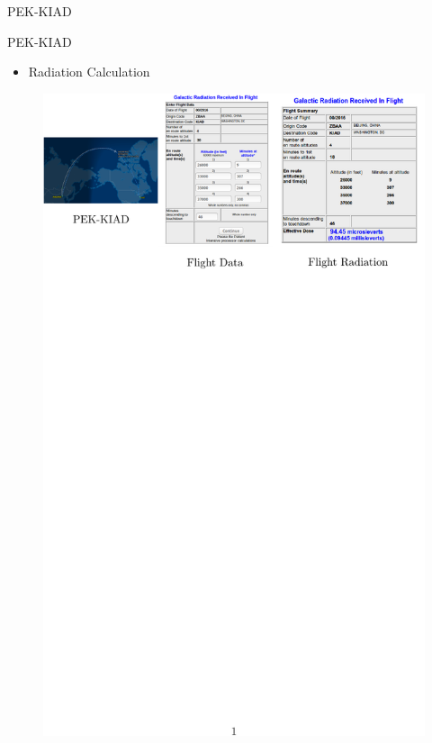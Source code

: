 \documentclass[aspectratio=1610]{beamer}
\begin{document}
\begin{frame}{PEK-KIAD}

\begin{block}{PEK-KIAD}
\end{block}
\begin{itemize}
\item Radiation Calculation

\end{itemize}
\vspace{-0.5cm}
\begin{figure}[]

   \includegraphics[scale=1.1]{images/PEK-TO-KIAD.pdf}   
 \end{figure} 
\end{frame}
\end{document}
